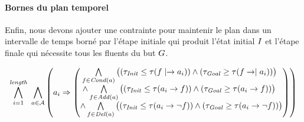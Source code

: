 \paragraph*{Bornes du plan temporel}
Enfin, nous devons ajouter une contrainte pour maintenir le plan dans un intervalle de temps borné par l'étape initiale qui produit l'état initial $I$ et l'étape finale qui nécessite tous les fluents du but $G$.
\begin{small}
\[
\BigforallTwo{i=1}{\length}~\Bigforall{\substack{\a\in \A}}%
\left(\a_{i} \Rightarrow \begin{pmatrix}\Bigforall{\substack{\f\in \cond{\a}}} \begin{pmatrix}\left(\tau_{\mathit{Init}} \leq \tau(\f\mid\rightarrow\a_{i}) \right)%
 \wedge \left(\tau_{\mathit{Goal}} \geq \tau(\f\rightarrow\mid\a_{i})\right) \end{pmatrix}\hfill\\
 \wedge \Bigforall{\substack{\f\in \add{\a}}} \begin{pmatrix}\left(\tau_{\mathit{Init}} \leq \tau(\a_{i}\rightarrow \f) \right)%
 \wedge \left(\tau_{\mathit{Goal}} \geq \tau(\a_{i}\rightarrow \f)\right) \end{pmatrix}\hfill\\
 \wedge \Bigforall{\substack{\f\in \del{\a}}} \begin{pmatrix}\left(\tau_{\mathit{Init}} \leq \tau(\a_{i}\rightarrow \neg \f) \right)%
 \wedge \left(\tau_{\mathit{Goal}} \geq \tau(\a_{i}\rightarrow \neg \f)\right) \end{pmatrix} \end{pmatrix}\right)%
\]
\end{small}


